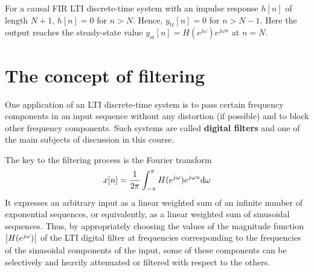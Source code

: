 \documentclass[../../main/main.tex]{subfiles}
\begin{document}
For a causal FIR LTI discrete-time system with an impulse response \( h[n] \) of length \( N+1 \), \( h[n] = 0 \) for \( n > N \). Hence, \( y_{\mathrm{tr}}[n] = 0 \) for \( n > N-1 \). Here the output reaches the steady-state value \( y_{\mathrm{sr}}[n] = H(e^{j \omega}) e^{j \omega n} \) at \( n = N \).





\section{The concept of filtering}
One application of an LTI discrete-time system is to pass certain frequency components in an input sequence without any distortion (if possible) and to block other frequency components. Such systems are called \textbf{digital filters} and one of the main subjects of discussion in this course.

The key to the filtering process is the Fourier transform
\begin{equation}
    x[n]
    =
    \frac{1}{2\pi} \int_{-\pi}^{\pi} H(e^{j \omega}) e^{j \omega n} \mathrm{d}{\omega}
    \label{eq:L09_S56_1}
\end{equation}
It expresses an arbitrary input as a linear weighted sum of an infinite number of exponential sequences, or equivalently, as a linear weighted sum of sinusoidal sequences.
Thus, by appropriately choosing the values of the magnitude function \( \abs{H(e^{j \omega})} \) of the LTI digital filter at frequencies corresponding to the frequencies of the sinusoidal components of the input, some of these components can be selectively and heavily attenuated or filtered with respect to the others.
\end{document}
